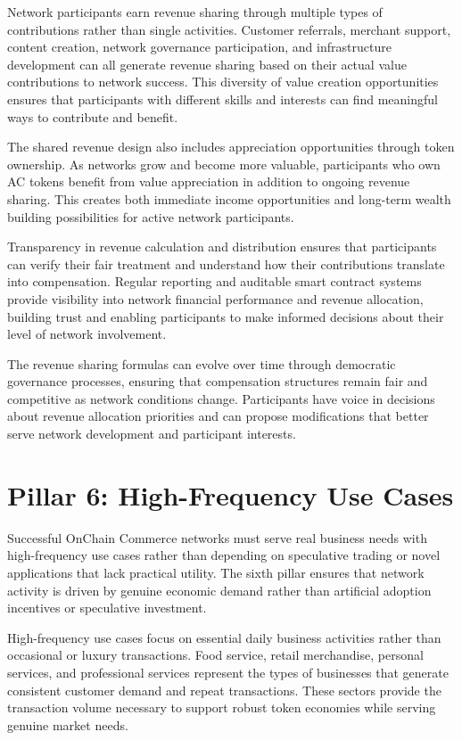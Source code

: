 \documentclass[
  Letterpaper,
]{scrbook}
\begin{document}
Network participants earn revenue sharing through multiple types of
contributions rather than single activities. Customer referrals,
merchant support, content creation, network governance participation,
and infrastructure development can all generate revenue sharing based on
their actual value contributions to network success. This diversity of
value creation opportunities ensures that participants with different
skills and interests can find meaningful ways to contribute and benefit.

The shared revenue design also includes appreciation opportunities
through token ownership. As networks grow and become more valuable,
participants who own AC tokens benefit from value appreciation in
addition to ongoing revenue sharing. This creates both immediate income
opportunities and long-term wealth building possibilities for active
network participants.

Transparency in revenue calculation and distribution ensures that
participants can verify their fair treatment and understand how their
contributions translate into compensation. Regular reporting and
auditable smart contract systems provide visibility into network
financial performance and revenue allocation, building trust and
enabling participants to make informed decisions about their level of
network involvement.

The revenue sharing formulas can evolve over time through democratic
governance processes, ensuring that compensation structures remain fair
and competitive as network conditions change. Participants have voice in
decisions about revenue allocation priorities and can propose
modifications that better serve network development and participant
interests.

\section{Pillar 6: High-Frequency Use
Cases}\label{pillar-6-high-frequency-use-cases}

Successful OnChain Commerce networks must serve real business needs with
high-frequency use cases rather than depending on speculative trading or
novel applications that lack practical utility. The sixth pillar ensures
that network activity is driven by genuine economic demand rather than
artificial adoption incentives or speculative investment.

High-frequency use cases focus on essential daily business activities
rather than occasional or luxury transactions. Food service, retail
merchandise, personal services, and professional services represent the
types of businesses that generate consistent customer demand and repeat
transactions. These sectors provide the transaction volume necessary to
support robust token economies while serving genuine market needs.
\end{document}
